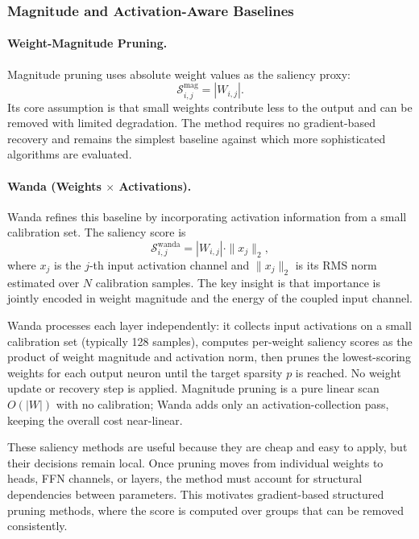 \subsubsection{Magnitude and Activation-Aware Baselines}

\paragraph{Weight-Magnitude Pruning.}
Magnitude pruning uses absolute weight values as the saliency proxy:
\begin{equation}
	\mathcal{S}^{\mathrm{mag}}_{i,j} = |W_{i,j}|.
\end{equation}
Its core assumption is that small weights contribute less to the output and can be removed with limited degradation. The method requires no gradient-based recovery and remains the simplest baseline against which more sophisticated algorithms are evaluated.

\methodsep

\paragraph{Wanda (Weights $\times$ Activations).}
Wanda \cite{sun2023simple} refines this baseline by incorporating activation information from a small calibration set. The saliency score is
\begin{equation}
	\mathcal{S}^{\mathrm{wanda}}_{i,j} = |W_{i,j}| \cdot \|x_j\|_2,
\end{equation}
where $x_j$ is the $j$-th input activation channel and $\|x_j\|_2$ is its RMS norm estimated over $N$ calibration samples. The key insight is that importance is jointly encoded in weight magnitude and the energy of the coupled input channel.

Wanda processes each layer independently: it collects input activations on a small calibration set (typically 128 samples), computes per-weight saliency scores as the product of weight magnitude and activation norm, then prunes the lowest-scoring weights for each output neuron until the target sparsity $p$ is reached. No weight update or recovery step is applied. Magnitude pruning is a pure linear scan $O(|W|)$ with no calibration; Wanda adds only an activation-collection pass, keeping the overall cost near-linear.

These saliency methods are useful because they are cheap and easy to apply, but their decisions remain local. Once pruning moves from individual weights to heads, FFN channels, or layers, the method must account for structural dependencies between parameters. This motivates gradient-based structured pruning methods, where the score is computed over groups that can be removed consistently.

